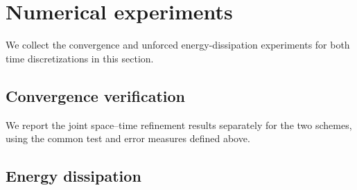 \section{Numerical experiments}
\label{sec:numerical-experiments}
We collect the convergence and unforced energy-dissipation experiments
for both time discretizations in this section.



\subsection{Convergence verification}
\label{subsec:convergence-verification}
We report the joint space--time refinement results separately for the
two schemes, using the common test and error measures defined above.



\subsection{Energy dissipation}
\label{subsec:energy-dissipation}



\FloatBarrier
